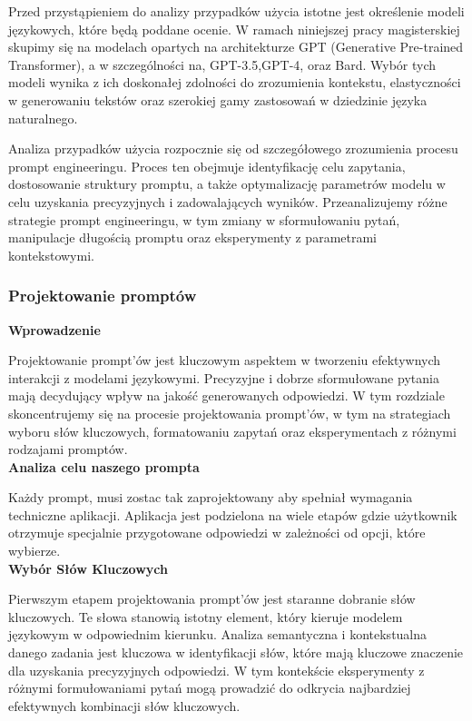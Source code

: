 Przed przystąpieniem do analizy przypadków użycia istotne jest określenie modeli językowych, które będą poddane ocenie. W ramach niniejszej pracy magisterskiej skupimy się na modelach opartych na architekturze GPT (Generative Pre-trained Transformer), a w szczególności na, GPT-3.5,GPT-4, oraz Bard. Wybór tych modeli wynika z ich doskonałej zdolności do zrozumienia kontekstu, elastyczności w generowaniu tekstów oraz szerokiej gamy zastosowań w dziedzinie języka naturalnego.
 
Analiza przypadków użycia rozpocznie się od szczegółowego zrozumienia procesu prompt engineeringu. Proces ten obejmuje identyfikację celu zapytania, dostosowanie struktury promptu, a także optymalizację parametrów modelu w celu uzyskania precyzyjnych i zadowalających wyników. Przeanalizujemy różne strategie prompt engineeringu, w tym zmiany w sformułowaniu pytań, manipulacje długością promptu oraz eksperymenty z parametrami kontekstowymi.

\subsubsection{Projektowanie promptów}

\noindent\textbf{Wprowadzenie}

Projektowanie prompt'ów jest kluczowym aspektem w tworzeniu efektywnych interakcji z modelami językowymi. Precyzyjne i dobrze sformułowane pytania mają decydujący wpływ na jakość generowanych odpowiedzi. W tym rozdziale skoncentrujemy się na procesie projektowania prompt'ów, w tym na strategiach wyboru słów kluczowych, formatowaniu zapytań oraz eksperymentach z różnymi rodzajami promptów.
\\

\noindent\textbf{Analiza celu naszego prompta}

Każdy prompt, musi zostac tak zaprojektowany aby spełniał wymagania techniczne aplikacji.
Aplikacja jest podzielona na wiele etapów gdzie użytkownik otrzymuje specjalnie przygotowane odpowiedzi w zależności od opcji, które wybierze.
\\

\noindent\textbf{Wybór Słów Kluczowych}

Pierwszym etapem projektowania prompt'ów jest staranne dobranie słów kluczowych. Te słowa stanowią istotny element, który kieruje modelem językowym w odpowiednim kierunku. Analiza semantyczna i kontekstualna danego zadania jest kluczowa w identyfikacji słów, które mają kluczowe znaczenie dla uzyskania precyzyjnych odpowiedzi. W tym kontekście eksperymenty z różnymi formułowaniami pytań mogą prowadzić do odkrycia najbardziej efektywnych kombinacji słów kluczowych.
\\

